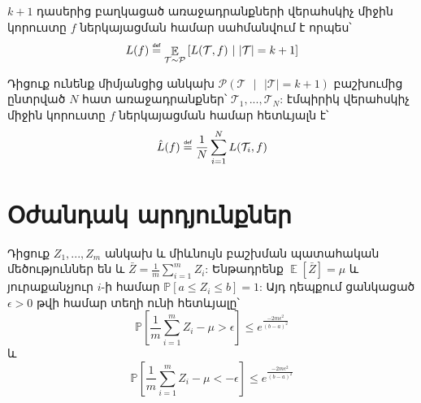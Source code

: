\documentclass[11pt]{article}
\DeclareMathOperator*{\E}{\mathbb{E}}
\newcommand\defeq{\mathrel{\overset{\makebox[0pt]{\mbox{\normalfont\tiny\sffamily def}}}{=}}}
\begin{document}
\begin{defination}
$k+1$ դասերից բաղկացած առաջադրանքների վերահսկիչ միջին կորուստը $f$ ներկայացման համար սահմանվում է որպես՝ 
$$L(f) \defeq \E_{\mathcal{T} \sim \mathcal{P}} \left [L (\mathcal{T}, f) \text{ } | \text{ } |\mathcal{T}| = k+1\right]$$
\end{defination}

\begin{defination}
Դիցուք ունենք միմյանցից անկախ $\mathcal{P}(\mathcal{T} \text{ } |\text{ }  |\mathcal{T}| = k +1)$ բաշխումից ընտրված $N$ հատ առաջադրանքներ՝ $\mathcal{T}_1, ..., \mathcal{T}_N$:
էմպիրիկ վերահսկիչ միջին կորուստը $f$ ներկայացման համար հետևյալն է՝ 
$$\hat{L}(f) \defeq \frac{1}{N}\sum_{i=1}^{N}L (\mathcal{T}_i, f)$$
\end{defination}
\pagebreak
\section*{\hfill Օժանդակ արդյունքներ \hfill} \noindent

{}


\begin{lemma}
\label{hofding_inq}
Դիցուք $Z_1, ..., Z_m$ անկախ և միևնույն բաշխման պատահական մեծություններ են և $\bar{Z} = \frac{1}{m}\sum_{i=1}^m{Z_i}$: Ենթադրենք $\E[\bar{Z}] = \mu$ և յուրաքանչյուր $i$-ի համար $\mathbb{P}[a \leq Z_i \leq b] = 1$: Այդ դեպքում ցանկացած $\epsilon > 0$ թվի համար տեղի ունի հետևյալը՝
$$\mathbb{P}\left[ \frac{1}{m}\sum_{i=1}^m{Z_i}-\mu > \epsilon \right] \leq e^{\frac{-2m\epsilon^2}{(b-a)^2}}$$ 
և
$$\mathbb{P}\left[ \frac{1}{m}\sum_{i=1}^m{Z_i}-\mu < -\epsilon \right] \leq e^{\frac{-2m\epsilon^2}{(b-a)^2}}$$ 
\end{lemma}
\end{document}
